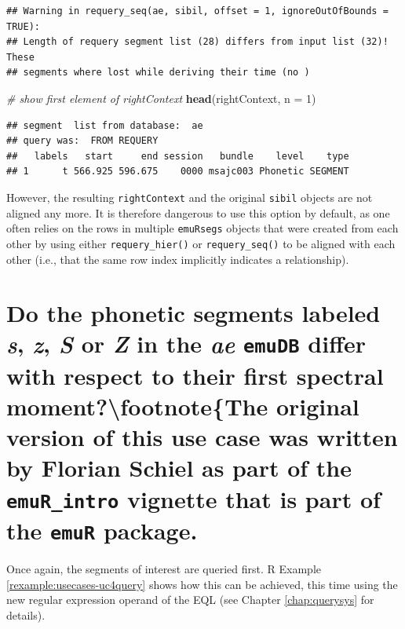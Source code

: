 \documentclass[]{book}
\newenvironment{Shaded}{\begin{snugshade}}{\end{snugshade}}
\newcommand{\CommentTok}[1]{\textcolor[rgb]{0.56,0.35,0.01}{\textit{#1}}}
\newcommand{\DataTypeTok}[1]{\textcolor[rgb]{0.13,0.29,0.53}{#1}}
\newcommand{\DecValTok}[1]{\textcolor[rgb]{0.00,0.00,0.81}{#1}}
\newcommand{\KeywordTok}[1]{\textcolor[rgb]{0.13,0.29,0.53}{\textbf{#1}}}
\newcommand{\NormalTok}[1]{#1}
\theoremstyle{definition}
\theoremstyle{definition}
\theoremstyle{definition}
\theoremstyle{remark}
\begin{document}
\begin{verbatim}
## Warning in requery_seq(ae, sibil, offset = 1, ignoreOutOfBounds = TRUE):
## Length of requery segment list (28) differs from input list (32)! These
## segments where lost while deriving their time (no )
\end{verbatim}

\begin{Shaded}
\begin{Highlighting}[]
\CommentTok{# show first element of rightContext}
\KeywordTok{head}\NormalTok{(rightContext, }\DataTypeTok{n =} \DecValTok{1}\NormalTok{)}
\end{Highlighting}
\end{Shaded}

\begin{verbatim}
## segment  list from database:  ae 
## query was:  FROM REQUERY 
##   labels   start     end session   bundle    level    type
## 1      t 566.925 596.675    0000 msajc003 Phonetic SEGMENT
\end{verbatim}

However, the resulting \texttt{rightContext} and the original
\texttt{sibil} objects are not aligned any more. It is therefore
dangerous to use this option by default, as one often relies on the rows
in multiple \texttt{emuRsegs} objects that were created from each other
by using either \texttt{requery\_hier()} or \texttt{requery\_seq()} to
be aligned with each other (i.e., that the same row index implicitly
indicates a relationship).

\hypertarget{sec:app-chap-useCases-q4}{%
\section{\texorpdfstring{Do the phonetic segments labeled \emph{s},
\emph{z}, \emph{S} or \emph{Z} in the \emph{ae} \texttt{emuDB} differ
with respect to their first spectral
moment?\protect\textbackslash{}footnote\{The original version of this
use case was written by Florian Schiel as part of the
\texttt{emuR\_intro} vignette that is part of the \texttt{emuR}
package.}{Do the phonetic segments labeled s, z, S or Z in the ae emuDB differ with respect to their first spectral moment?\textbackslash{}footnote\{The original version of this use case was written by Florian Schiel as part of the emuR\_intro vignette that is part of the emuR package.}}\label{sec:app-chap-useCases-q4}}

Once again, the segments of interest are queried first. R Example
\ref{rexample:usecases-uc4query} shows how this can be achieved, this
time using the new regular expression operand of the EQL (see Chapter
\ref{chap:querysys} for details).
\end{document}
